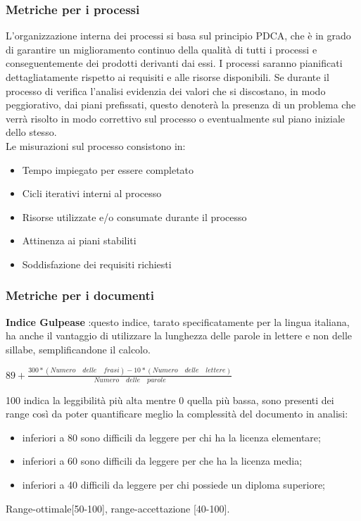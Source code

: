 		\subsubsection{Metriche per i processi}
		L'organizzazione interna dei processi si basa sul principio PDCA, che è in grado di garantire un miglioramento continuo della qualità di tutti i processi e conseguentemente dei prodotti derivanti dai essi.
I processi saranno pianificati dettagliatamente rispetto ai requisiti e alle risorse disponibili. Se durante il processo di verifica l'analisi evidenzia dei valori che si discostano, in modo peggiorativo, dai piani prefissati, questo denoterà la presenza di un problema che verrà risolto in modo correttivo sul processo o eventualmente sul piano iniziale dello stesso.\\
		Le misurazioni sul processo consistono in:
			\begin{itemize}
				\item Tempo impiegato per essere completato
				\item Cicli iterativi interni al processo
				\item Risorse utilizzate e/o consumate durante il processo
				\item Attinenza ai piani stabiliti
				\item Soddisfazione dei requisiti richiesti
			\end{itemize}

		\subsubsection{Metriche per i documenti}
		\textbf{Indice Gulpease} :questo indice, tarato specificatamente per la lingua italiana, ha anche il vantaggio di utilizzare la lunghezza delle parole in lettere e non delle sillabe, semplificandone il calcolo.
			\begin{center}
				\begin{math}
					89+\frac{300*(Numero\quad delle\quad frasi)-10*(Numero\quad delle\quad lettere)}{Numero\quad delle\quad parole}
				\end{math}
			\end{center}
		100 indica la leggibilità più alta mentre 0 quella più bassa, sono presenti dei range così da poter quantificare meglio la complessità del documento in analisi:
			\begin{itemize}
				\item inferiori a 80 sono difficili da leggere per chi ha la licenza elementare;
				\item inferiori a 60 sono difficili da leggere per che ha la licenza media;
				\item inferiori a 40 difficili da leggere per chi possiede un diploma superiore;
			\end{itemize}
		Range-ottimale[50-100], range-accettazione [40-100].

